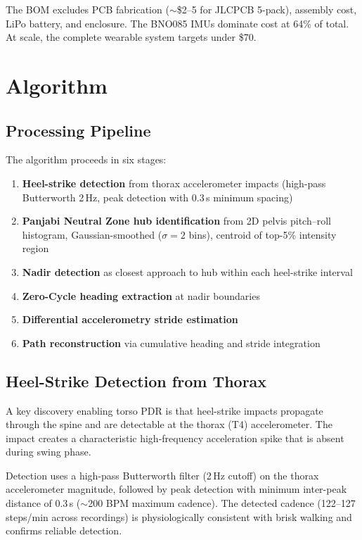 \documentclass[11pt,a4paper]{article}
\begin{document}
The BOM excludes PCB fabrication (${\sim}$\$2--5 for JLCPCB 5-pack), assembly
cost, LiPo battery, and enclosure. The BNO085 IMUs dominate cost at 64\% of
total. At scale, the complete wearable system targets under \$70.

\section{Algorithm}
\label{sec:algorithm}

\subsection{Processing Pipeline}

The algorithm proceeds in six stages:
\begin{enumerate}[nosep]
\item \textbf{Heel-strike detection} from thorax accelerometer impacts
(high-pass Butterworth 2\,Hz, peak detection with 0.3\,s minimum spacing)
\item \textbf{Panjabi Neutral Zone hub identification} from 2D pelvis
pitch--roll histogram, Gaussian-smoothed ($\sigma = 2$ bins), centroid of
top-5\% intensity region
\item \textbf{Nadir detection} as closest approach to hub within each
heel-strike interval
\item \textbf{Zero-Cycle heading extraction} at nadir boundaries
\item \textbf{Differential accelerometry stride estimation}
\item \textbf{Path reconstruction} via cumulative heading and stride
integration
\end{enumerate}

\subsection{Heel-Strike Detection from Thorax}

A key discovery enabling torso PDR is that heel-strike impacts propagate
through the spine and are detectable at the thorax (T4) accelerometer. The
impact creates a characteristic high-frequency acceleration spike that is
absent during swing phase.

Detection uses a high-pass Butterworth filter (2\,Hz cutoff) on the thorax
accelerometer magnitude, followed by peak detection with minimum inter-peak
distance of 0.3\,s (${\sim}$200 BPM maximum cadence). The detected cadence
(122--127\,steps/min across recordings) is physiologically consistent with
brisk walking and confirms reliable detection.
\end{document}
